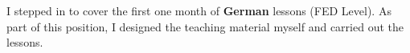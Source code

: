 
I stepped in to cover the first one month of \textbf{German} lessons (FED Level). As part of this
position, I designed the teaching material myself and carried out the lessons.
